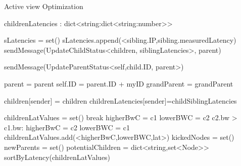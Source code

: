 \begin{algorithm}
\begin{algorithmic}[1]
    \caption{Active view Optimization}

    \asdstate
        \State childrenLatencies : dict<string:dict<string:number>>
    \asdend

            \State sLatencies = set()
                \State sLatencies.append(<sibling.IP,sibling.measuredLatency)
            \EndFor
            \State sendMessage(UpdateChildStatus<children, siblingLatencies>, parent)
        \EndIf
    \asdend

            \State sendMessage(UpdateParentStatus<self,child.ID, parent>)
        \EndFor
    \asdend

            \State parent = parent
            \State self.ID = parent.ID + myID
            \State grandParent = grandParent
        \EndIf
    \asdend

            \State children[sender] = children
            \State childrenLatencies[sender]=childSiblingLatencies
        \EndIf
    \asdend

        \State childrenLatValues = set()
                    \State break    
                \EndIf
                \State higherBwC = c1
                \State lowerBWC = c2
                \If c2.bw > c1.bw:
                    \State higherBwC = c2
                    \State lowerBWC = c1 
                \EndIf
                \State childrenLatValues.add(<higherBwC,lowerBWC,lat>)
            \EndFor
        \EndFor
        \State kickedNodes = set()
        \State newParents = set()
        \State potentialChildren = dict<string,set<Node>>
        \State sortByLatency(childrenLatValues)


\end{algorithmic}
\end{algorithm}
